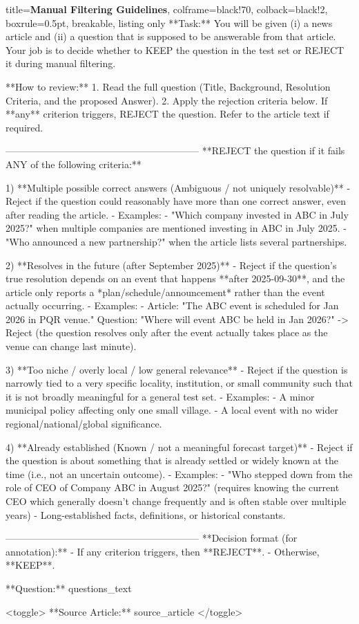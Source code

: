 \begin{tcblisting}{
  title={\textbf{Manual Filtering Guidelines}},
  colframe=black!70,
  colback=black!2,
  boxrule=0.5pt,
  breakable,
  listing only
}
**Task:** You will be given (i) a news article and (ii) a question that is supposed to be answerable from that article. Your job is to decide whether to KEEP the question in the test set or REJECT it during manual filtering.

**How to review:**
1. Read the full question (Title, Background, Resolution Criteria, and the proposed Answer).
2. Apply the rejection criteria below. If **any** criterion triggers, REJECT the question. Refer to the article text if required.

------------------------------------------------------------
**REJECT the question if it fails ANY of the following criteria:**

1) **Multiple possible correct answers (Ambiguous / not uniquely resolvable)**
   - Reject if the question could reasonably have more than one correct answer, even after reading the article.
   - Examples:
     - "Which company invested in ABC in July 2025?" when multiple companies are mentioned investing in ABC in July 2025.
     - "Who announced a new partnership?" when the article lists several partnerships.

2) **Resolves in the future (after September 2025)**
   - Reject if the question's true resolution depends on an event that happens **after 2025-09-30**, and the article only reports a *plan/schedule/announcement* rather than the event actually occurring.
   - Examples:
     - Article: "The ABC event is scheduled for Jan 2026 in PQR venue."
       Question: "Where will event ABC be held in Jan 2026?" -> Reject (the question resolves only after the event actually takes place as the venue can change last minute).

3) **Too niche / overly local / low general relevance**
   - Reject if the question is narrowly tied to a very specific locality, institution, or small community such that it is not broadly meaningful for a general test set.
   - Examples:
     - A minor municipal policy affecting only one small village.
     - A local event with no wider regional/national/global significance.

4) **Already established (Known / not a meaningful forecast target)**
   - Reject if the question is about something that is already settled or widely known at the time (i.e., not an uncertain outcome).
   - Examples:
     - "Who stepped down from the role of CEO of Company ABC in August 2025?" (requires knowing the current CEO which generally doesn't change frequently and is often stable over multiple years)
     - Long-established facts, definitions, or historical constants.

------------------------------------------------------------
**Decision format (for annotation):**
- If any criterion triggers, then **REJECT**.
- Otherwise, **KEEP**.

**Question:**
{questions_text}

<toggle> **Source Article:** {source_article} </toggle>
\end{tcblisting}



\clearpage

